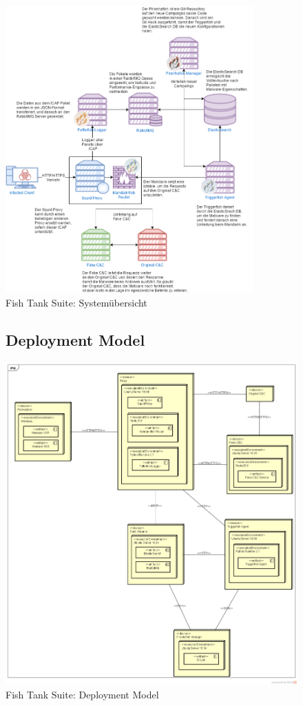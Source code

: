 \begin{figure}[H]
	\centering
	\includegraphics[width=0.85\textwidth]{img/FTS-Systemubersicht.png}
	\caption{Fish Tank Suite: Systemübersicht}
	\label{fig:Fish_Tank_Suite_Systemübersicht}
\end{figure}


\begin{figure}[H]
	\subsection{Deployment Model}
	\centering
	\includegraphics[width=\textwidth]{img/DeploymentDiagram.png}
	\caption{Fish Tank Suite: Deployment Model}
	\label{fig:Fish_Tank_Suite_Deployment_Model}
\end{figure}


